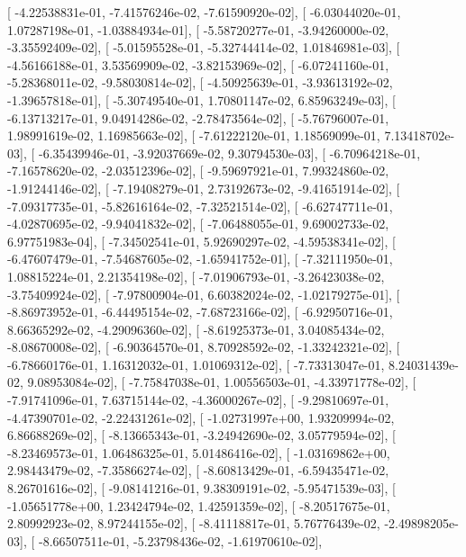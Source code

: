 \documentclass{article}
\begin{document}
       [ -4.22538831e-01,  -7.41576246e-02,  -7.61590920e-02],
       [ -6.03044020e-01,   1.07287198e-01,  -1.03884934e-01],
       [ -5.58720277e-01,  -3.94260000e-02,  -3.35592409e-02],
       [ -5.01595528e-01,  -5.32744414e-02,   1.01846981e-03],
       [ -4.56166188e-01,   3.53569909e-02,  -3.82153969e-02],
       [ -6.07241160e-01,  -5.28368011e-02,  -9.58030814e-02],
       [ -4.50925639e-01,  -3.93613192e-02,  -1.39657818e-01],
       [ -5.30749540e-01,   1.70801147e-02,   6.85963249e-03],
       [ -6.13713217e-01,   9.04914286e-02,  -2.78473564e-02],
       [ -5.76796007e-01,   1.98991619e-02,   1.16985663e-02],
       [ -7.61222120e-01,   1.18569099e-01,   7.13418702e-03],
       [ -6.35439946e-01,  -3.92037669e-02,   9.30794530e-03],
       [ -6.70964218e-01,  -7.16578620e-02,  -2.03512396e-02],
       [ -9.59697921e-01,   7.99324860e-02,  -1.91244146e-02],
       [ -7.19408279e-01,   2.73192673e-02,  -9.41651914e-02],
       [ -7.09317735e-01,  -5.82616164e-02,  -7.32521514e-02],
       [ -6.62747711e-01,  -4.02870695e-02,  -9.94041832e-02],
       [ -7.06488055e-01,   9.69002733e-02,   6.97751983e-04],
       [ -7.34502541e-01,   5.92690297e-02,  -4.59538341e-02],
       [ -6.47607479e-01,  -7.54687605e-02,  -1.65941752e-01],
       [ -7.32111950e-01,   1.08815224e-01,   2.21354198e-02],
       [ -7.01906793e-01,  -3.26423038e-02,  -3.75409924e-02],
       [ -7.97800904e-01,   6.60382024e-02,  -1.02179275e-01],
       [ -8.86973952e-01,  -6.44495154e-02,  -7.68723166e-02],
       [ -6.92950716e-01,   8.66365292e-02,  -4.29096360e-02],
       [ -8.61925373e-01,   3.04085434e-02,  -8.08670008e-02],
       [ -6.90364570e-01,   8.70928592e-02,  -1.33242321e-02],
       [ -6.78660176e-01,   1.16312032e-01,   1.01069312e-02],
       [ -7.73313047e-01,   8.24031439e-02,   9.08953084e-02],
       [ -7.75847038e-01,   1.00556503e-01,  -4.33971778e-02],
       [ -7.91741096e-01,   7.63715144e-02,  -4.36000267e-02],
       [ -9.29810697e-01,  -4.47390701e-02,  -2.22431261e-02],
       [ -1.02731997e+00,   1.93209994e-02,   6.86688269e-02],
       [ -8.13665343e-01,  -3.24942690e-02,   3.05779594e-02],
       [ -8.23469573e-01,   1.06486325e-01,   5.01486416e-02],
       [ -1.03169862e+00,   2.98443479e-02,  -7.35866274e-02],
       [ -8.60813429e-01,  -6.59435471e-02,   8.26701616e-02],
       [ -9.08141216e-01,   9.38309191e-02,  -5.95471539e-03],
       [ -1.05651778e+00,   1.23424794e-02,   1.42591359e-02],
       [ -8.20517675e-01,   2.80992923e-02,   8.97244155e-02],
       [ -8.41118817e-01,   5.76776439e-02,  -2.49898205e-03],
       [ -8.66507511e-01,  -5.23798436e-02,  -1.61970610e-02],
\end{document}
